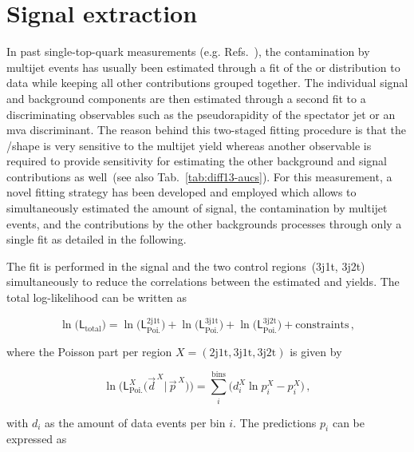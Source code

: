 \section{Signal extraction}
\label{sec:diff13-fit}

In past single-top-quark measurements (e.g. Refs.~\cite{Khachatryan:2015dzz,Khachatryan:2014iya,Sirunyan:2016cdg}), the contamination by multijet events has usually been estimated through a fit of the \mtw or \met distribution to data while keeping all other contributions grouped together. The individual signal and background components are then estimated through a second fit to a discriminating observables such as the pseudorapidity of the spectator jet or an \gls{mva} discriminant. The reason behind this two-staged fitting procedure is that the \mtw/\met shape is very sensitive to the multijet yield whereas another observable is required to provide sensitivity for estimating the other background and signal contributions as well~(see also Tab.~\ref{tab:diff13-aucs}). For this measurement, a novel fitting strategy has been developed and employed which allows to simultaneously estimated the amount of signal, the contamination by multijet events, and the contributions by the other backgrounds processes through only a single fit as detailed in the following.

The fit is performed in the signal and the two \ttbar control regions~(3j1t, 3j2t) simultaneously to reduce the correlations between the estimated \wjets and \ttbar yields. The total log-likelihood can be written as

\begin{equation}
\ln\big(\mathsf{L}_\mathrm{total}\big)=\ln\big(\mathsf{L}^\mathrm{2j1t}_\mathrm{Poi.}\big)+\ln\big(\mathsf{L}_\mathrm{Poi.}^\mathrm{3j1t}\big)+\ln\big(\mathsf{L}_\mathrm{Poi.}^\mathrm{3j2t}\big)+\mathrm{constraints}\,,
\end{equation}

where the Poisson part per region $X=(\mathrm{2j1t, 3j1t, 3j2t})$ is given by

\begin{equation}
\ln\Big(\mathsf{L}^{X}_\mathrm{Poi.}\big(\vec{d}^{\,X}|\,\vec{p}^{\,X}\big)\Big)=\sum_{i}^\mathrm{bins}\Big(d_{i}^{X}\ln p_{i}^{X}-p_{i}^{X}\Big)\,,
\end{equation}

with $d_{i}$ as the amount of data events per bin $i$. The predictions $p_{i}$ can be expressed as

